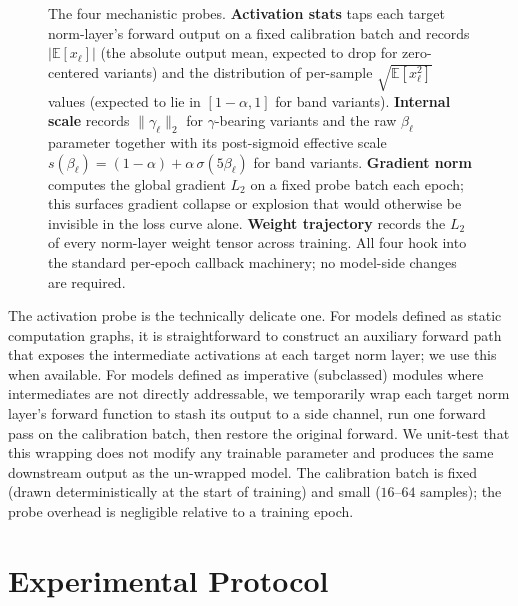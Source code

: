 \documentclass{article}
\newcommand{\E}{\mathbb{E}}
\begin{document}
\begin{figure}[H]
{%
}
\caption{The four mechanistic probes. \textbf{Activation stats} taps each target norm-layer's forward output on a fixed calibration batch and records $|\E[x_\ell]|$ (the absolute output mean, expected to drop for zero-centered variants) and the distribution of per-sample $\sqrt{\E[x_\ell^2]}$ values (expected to lie in $[1-\alpha,1]$ for band variants). \textbf{Internal scale} records $\|\gamma_\ell\|_2$ for $\gamma$-bearing variants and the raw $\beta_\ell$ parameter together with its post-sigmoid effective scale $s(\beta_\ell) = (1-\alpha) + \alpha\,\sigma(5\beta_\ell)$ for band variants. \textbf{Gradient norm} computes the global gradient $L_2$ on a fixed probe batch each epoch; this surfaces gradient collapse or explosion that would otherwise be invisible in the loss curve alone. \textbf{Weight trajectory} records the $L_2$ of every norm-layer weight tensor across training. All four hook into the standard per-epoch callback machinery; no model-side changes are required.}
\label{fig:probes}
\end{figure}

The activation probe is the technically delicate one.
For models defined as static computation graphs, it is straightforward to construct an auxiliary forward path that exposes the intermediate activations at each target norm layer; we use this when available.
For models defined as imperative (subclassed) modules where intermediates are not directly addressable, we temporarily wrap each target norm layer's forward function to stash its output to a side channel, run one forward pass on the calibration batch, then restore the original forward.
We unit-test that this wrapping does not modify any trainable parameter and produces the same downstream output as the un-wrapped model.
The calibration batch is fixed (drawn deterministically at the start of training) and small ($16$--$64$ samples); the probe overhead is negligible relative to a training epoch.

\section{Experimental Protocol}
\label{sec:protocol}
\end{document}
